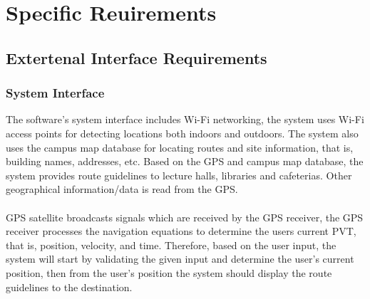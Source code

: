 \documentclass[12pt, a4paper]{article}
\begin{document}
\section{Specific Reuirements}
	\subsection{Extertenal Interface Requirements}
		\subsubsection{System Interface}
The software’s system interface includes Wi-Fi networking, the system uses Wi-Fi access points for detecting locations both indoors and outdoors. The system also uses the campus map database for locating routes and site information, that is, building names, addresses, etc. Based on the GPS and campus map database, the system provides route guidelines to lecture halls, libraries and cafeterias. Other geographical information/data is read from the GPS. \\\\ GPS satellite broadcasts signals which are received by the GPS receiver, the GPS receiver processes the navigation equations to determine the users current PVT, that is, position, velocity, and time. Therefore, based on the user input, the system will start by validating the given input and determine the user’s current position, then from the user’s position the system should display the route guidelines to the destination.\\
\end{document}
